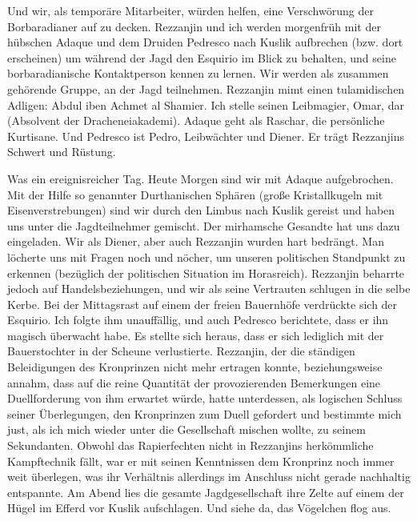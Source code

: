 Und wir, als temporäre Mitarbeiter, würden helfen, eine Verschwörung der Borbaradianer auf zu decken. Rezzanjin und ich werden morgenfrüh mit der hübschen Adaque und dem Druiden Pedresco nach Kuslik aufbrechen (bzw. dort erscheinen) um während der Jagd den Esquirio im Blick zu behalten, und seine borbaradianische Kontaktperson kennen zu lernen. Wir werden als zusammen gehörende Gruppe, an der Jagd teilnehmen. Rezzanjin mimt einen tulamidischen Adligen: Abdul iben Achmet al Shamier. Ich stelle seinen Leibmagier, Omar, dar (Absolvent der Dracheneiakademi). Adaque geht als Raschar, die persönliche Kurtisane. Und Pedresco ist Pedro, Leibwächter und Diener. Er trägt Rezzanjins Schwert und Rüstung.

Was ein ereignisreicher Tag. Heute Morgen sind wir mit Adaque aufgebrochen. Mit der Hilfe so genannter Durthanischen Sphären (große Kristallkugeln mit Eisenverstrebungen) sind wir durch den Limbus nach Kuslik gereist und haben uns unter die Jagdteilnehmer gemischt. Der mirhamsche Gesandte hat uns dazu eingeladen. Wir als Diener, aber auch Rezzanjin wurden hart bedrängt. Man löcherte uns mit Fragen noch und nöcher, um unseren politischen Standpunkt zu erkennen (bezüglich der politischen Situation im Horasreich). Rezzanjin beharrte jedoch auf Handelsbeziehungen, und wir als seine Vertrauten schlugen in die selbe Kerbe. Bei der Mittagsrast auf einem der freien Bauernhöfe verdrückte sich der Esquirio. Ich folgte ihm unauffällig, und auch Pedresco berichtete, dass er ihn magisch überwacht habe. Es stellte sich heraus, dass er sich lediglich mit der Bauerstochter in der Scheune verlustierte. Rezzanjin, der die ständigen Beleidigungen des Kronprinzen nicht mehr ertragen konnte, beziehungsweise annahm, dass auf die reine Quantität der provozierenden Bemerkungen eine Duellforderung von ihm erwartet würde, hatte unterdessen, als logischen Schluss seiner Überlegungen, den Kronprinzen zum Duell gefordert und bestimmte mich just, als ich mich wieder unter die Gesellschaft mischen wollte, zu seinem Sekundanten. Obwohl das Rapierfechten nicht in Rezzanjins herkömmliche Kampftechnik fällt, war er mit seinen Kenntnissen dem Kronprinz noch immer weit überlegen, was ihr Verhältnis allerdings im Anschluss nicht gerade nachhaltig entspannte. Am Abend lies die gesamte Jagdgesellschaft ihre Zelte auf einem der Hügel im Efferd vor Kuslik aufschlagen. Und siehe da, das Vögelchen flog aus.

